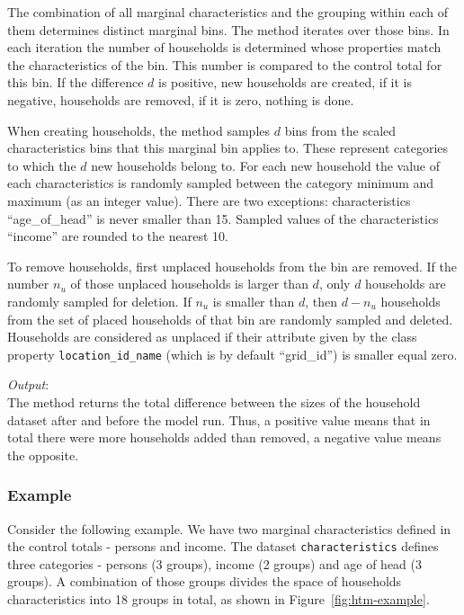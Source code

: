 The combination of all marginal characteristics and the grouping within each
of them determines distinct marginal bins.  The method iterates over those
bins. In each iteration the number of households is determined whose
properties match the characteristics of the bin. This number is compared to
the control total for this bin. If the difference $d$ is positive, new
households are created, if it is negative, households are removed, if it is
zero, nothing is done.

When creating households, the method samples $d$ bins from the scaled
characteristics bins that this marginal bin applies to. These represent
categories to which the $d$ new households belong to. For each new household
the value of each characteristics is randomly sampled between the category
minimum and maximum (as an integer value). There are two exceptions:
characteristics ``age_of_head'' is never smaller than 15. Sampled values of
the characteristics ``income'' are rounded to the nearest 10.

To remove households, first unplaced households from the bin are removed. If
the number $n_u$ of those unplaced households is larger than $d$, only $d$
households are randomly sampled for deletion. If $n_u$ is smaller than $d$,
then $d-n_u$ households from the set of placed households of that bin are
randomly sampled and deleted. Households are considered as unplaced if their
attribute given by the class property \verb|location_id_name| (which is by
default ``grid_id'') is smaller equal zero.

{\it Output}:~\\[1mm]
The method returns the total difference between the sizes of the household
dataset after and before the model run. Thus, a positive value means that in
total there were more households added than removed, a negative value means
the opposite.

%
\subsubsection{Example}
%
Consider the following example. We have two marginal characteristics defined
in the control totals - persons and income. The dataset \verb|characteristics|
defines three categories - persons (3 groups), income (2 groups) and age of
head (3 groups). A combination of those groups divides the space of households
characteristics into 18 groups in total, as shown in
Figure~\ref{fig:htm-example}.

